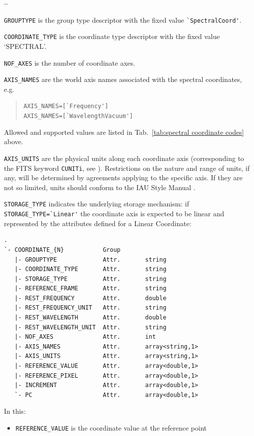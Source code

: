 \documentclass[a4paper,10pt,bibtotoc]{scrreprt}
\begin{document}
\begin{list}{\textbf{--}}{}
\item \verb|GROUPTYPE| is the group type descriptor with the fixed value \verb|`SpectralCoord'|.
\item \verb|COORDINATE_TYPE| is the coordinate type descriptor with the fixed value
  `SPECTRAL'.
\item \verb|NOF_AXES| is the number of coordinate axes.
\item \verb|AXIS_NAMES| are the world axis names associated with the
  spectral coordinates, e.g.
  \begin{verse}
    \verb|AXIS_NAMES=[`Frequency']| \\
    \verb|AXIS_NAMES=[`WavelengthVacuum']|
  \end{verse}
  Allowed and supported values are listed in Tab.~\ref{tab:spectral
    coordinate codes} above.
\item \verb|AXIS_UNITS| are the physical units along each coordinate axis
  (corresponding to the FITS keyword \verb|CUNITi|, see \cite{fits.paper1}).
  Restrictions on the nature and range of units, if any, will be determined by
  agreements applying to the specific axis. If they are not so limited, units
  should conform to the IAU Style Manual \cite{mcnally.1988}.
\item \verb|STORAGE_TYPE| indicates the underlying storage mechanism: if 
  \verb|STORAGE_TYPE=`Linear'| the coordinate axis is expected to be linear and
  represented by the attributes defined for a Linear Coordinate:
  \begin{lstlisting}
.
`- COORDINATE_{N}           Group
   |- GROUPTYPE             Attr.       string
   |- COORDINATE_TYPE       Attr.       string
   |- STORAGE_TYPE          Attr.       string
   |- REFERENCE_FRAME       Attr.       string
   |- REST_FREQUENCY        Attr.       double
   |- REST_FREQUENCY_UNIT   Attr.       string
   |- REST_WAVELENGTH       Attr.       double
   |- REST_WAVELENGTH_UNIT  Attr.       string
   |- NOF_AXES              Attr.       int
   |- AXIS_NAMES            Attr.       array<string,1>
   |- AXIS_UNITS            Attr.       array<string,1>
   |- REFERENCE_VALUE       Attr.       array<double,1>
   |- REFERENCE_PIXEL       Attr.       array<double,1>
   |- INCREMENT             Attr.       array<double,1>
   `- PC                    Attr.       array<double,1>
 \end{lstlisting}
 In this:
 \begin{itemize}
 \item \verb|REFERENCE_VALUE| is the coordinate value at the reference point

\end{itemize}
\end{list}
\end{document}
